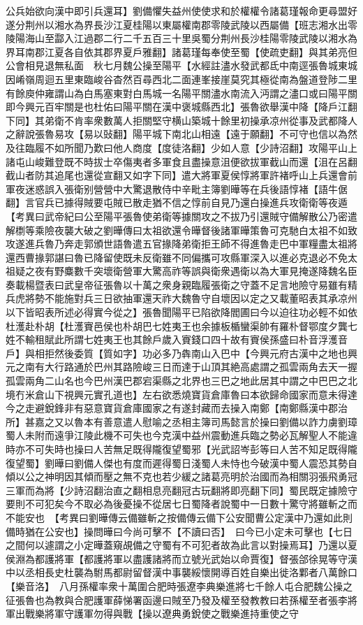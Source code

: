 公兵始欲向漢中即引兵還耳】劉備懼失益州使使求和於權權令諸葛瑾報命更尋盟好遂分荆州以湘水為界長沙江夏桂陽以東屬權南郡零陵武陵以西屬備【班志湘水出零陵陽海山至酃入江過郡二行二千五百三十里吳蜀分荆州長沙桂陽零陵武陵以湘水為界耳南郡江夏各自依其郡界夏戶雅翻】諸葛瑾每奉使至蜀【使疏吏翻】與其弟亮但公會相見退無私面　秋七月魏公操至陽平【水經註濜水發武都氐中南逕張魯城東城因崤嶺周迴五里東臨峻谷杳然百尋西北二面連峯接崖莫究其極從南為盤道登陟二里有餘庾仲雍謂山為白馬塞東對白馬城一名陽平關濜水南流入沔謂之濜口或曰陽平關即今興元百牢關是也杜佑曰陽平關在漢中褒城縣西北】張魯欲舉漢中降【降戶江翻下同】其弟衛不肯率衆數萬人拒關堅守横山築城十餘里初操承凉州從事及武都降人之辭說張魯易攻【易以䜴翻】陽平城下南北山相遠【遠于願翻】不可守也信以為然及往臨履不如所聞乃歎曰他人商度【度徒洛翻】少如人意【少詩沼翻】攻陽平山上諸屯山峻難登既不時拔士卒傷夷者多軍食且盡操意沮便欲拔軍截山而還【沮在呂翻截山者防其追尾也還從宣翻又如字下同】遣大將軍夏侯惇將軍許褚呼山上兵還會前軍夜迷惑誤入張衛别營營中大驚退散侍中辛毗主簿劉曄等在兵後語惇褚【語牛倨翻】言官兵已據得賊要屯賊已散走猶不信之惇前自見乃還白操進兵攻衛衛等夜遁　【考異曰武帝紀曰公至陽平張魯使弟衛等據關攻之不拔乃引還賊守備解散公乃密遣解檦等乘險夜襲大破之劉曄傳曰太祖欲還令曄督後諸軍曄策魯可克馳白太祖不如致攻遂進兵魯乃奔走郭頒世語魯遣五官掾降弟衛拒王師不得進魯走巴中軍糧盡太祖將還西曹掾郭諶曰魯已降留使既未反衛雖不同偏攜可攻縣軍深入以進必克退必不免太祖疑之夜有野麋數千突壞衛營軍大驚高祚等誤與衛衆遇衛以為大軍見掩遂降魏名臣奏載楊暨表曰武皇帝征張魯以十萬之衆身親臨履張衛之守蓋不足言地險守易雖有精兵虎將勢不能施對兵三日欲抽軍還天祚大魏魯守自壞因以定之又載董昭表其承凉州以下皆昭表所述必得實今從之】張魯聞陽平已陷欲降閻圃曰今以迫往功必輕不如依杜濩赴朴胡【杜濩賨邑侯也朴胡巴七姓夷王也余據板楯蠻渠帥有羅朴督鄂度夕龔七姓不輸租賦此所謂七姓夷王也其餘戶歲入賨錢口四十故有賨侯孫盛曰朴音浮濩音戶】與相拒然後委質【質如字】功必多乃犇南山入巴中【今興元府古漢中之地也興元之南有大行路通於巴州其路險峻三日而達于山頂其絶高處謂之孤雲兩角去天一握孤雲兩角二山名也今巴州漢巴郡宕渠縣之北界也三巴之地此居其中謂之中巴巴之北境冇米倉山下視興元實孔道也】左右欲悉燒寶貨倉庫魯曰本欲歸命國家而意未得達今之走避銳鋒非有惡意寶貨倉庫國家之有遂封藏而去操入南鄭【南鄭縣漢中郡治所】甚嘉之又以魯本有善意遣人慰喻之丞相主簿司馬懿言於操曰劉備以詐力虜劉璋蜀人未附而遠爭江陵此機不可失也今克漢中益州震動進兵臨之勢必瓦解聖人不能違時亦不可失時也操曰人苦無足既得隴復望蜀邪【光武詔岑彭等曰人苦不知足既得隴復望蜀】劉曄曰劉備人傑也有度而遲得蜀日淺蜀人未恃也今破漢中蜀人震恐其勢自傾以公之神明因其傾而壓之無不克也若少緩之諸葛亮明於治國而為相關羽張飛勇冠三軍而為將【少詩沼翻治直之翻相息亮翻冠古玩翻將即亮翻下同】蜀民既定據險守要則不可犯矣今不取必為後憂操不從居七日蜀降者說蜀中一日數十驚守將雖斬之而不能安也　【考異曰劉曄傳云備雖斬之按備傳云備下公安聞曹公定漢中乃還如此則備時猶在公安也】操問曄曰今尚可擊不【不讀曰否】　曰今已小定未可擊也【七日之間何以遽謂之小定曄蓋窺覘備之守蜀有不可犯者故為此言以對操焉耳】乃還以夏侯淵為都護將軍【都護將軍以盡護諸將而立號光武始以命賈復】督張郃徐晃等守漢中以丞相長史杜襲為駙馬都尉留督漢中事襲綏懷開導百姓自樂出徙洛鄴者八萬餘口【樂音洛】　八月孫權率衆十萬圍合肥時張遼李典樂進將七千餘人屯合肥魏公操之征張魯也為教與合肥護軍薛悌署函邊曰賊至乃發及權至發教教曰若孫權至者張李將軍出戰樂將軍守護軍勿得與戰【操以遼典勇銳使之戰樂進持重使之守